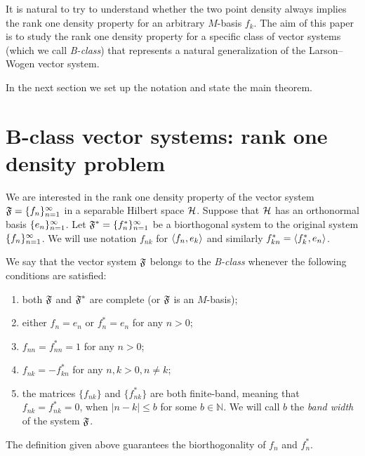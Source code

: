\documentclass[12pt,oneside,a4paper]{amsart}
\begin{document}
  It is natural to try to understand whether the two point density always implies the rank one density property for an arbitrary $M$-basis $f_k$.
  The aim of this paper is to study the rank one density property for a specific class of vector systems (which we call \emph{B-class})
    that represents a natural generalization of the Larson--Wogen vector system.

  In the next section we set up the notation and state the main theorem.

\bigskip
\section{B-class vector systems: rank one density problem}
    \label{fsys2graphs}
    We are interested in the rank one density property of the vector system $\fsys = \seq{f}$
      in a separable Hilbert space $\cal{H}$.
    Suppose that $\cal{H}$ has an orthonormal basis $\seq{e}$.
    Let $\fstarsys = \{f_n^{*}\}_{n=1}^\infty$ be a biorthogonal system to the original system $\seq{f}$.
    We will use notation $f_{nk}$ for $\inner{f_n}{e_k}$ and similarly $f^*_{kn} = \inner{f^*_k}{e_n}$.
    \begin{definition}
      We say that the vector system $\fsys$ belongs to the \emph{B-class} whenever the following conditions are satisfied:
      \begin{enumerate}[label=\textbf{C\arabic*}]
        \item \label{c1} both $\fsys$ and $\fstarsys$ are complete (or $\fsys$ is an $M$-basis);
        \item \label{c2} either $f_n = e_n$ or $f^*_n = e_n$ for any $n > 0$;
        \item \label{c3} $f_{nn} = f^*_{nn} = 1$ for any $n > 0$;
        \item \label{c4} $f_{nk} = -f^*_{kn}$ for any $n, k > 0, n \neq k$;
        \item \label{c5} the matrices $\{f_{nk}\}$ and $\{f^*_{nk}\}$ are both finite-band,
          meaning that $f_{nk} = f^*_{nk} = 0$, when $\lvert n - k \rvert \leq b$ for some $b \in \mathbb{N}$.
          We will call $b$ the \emph{band width} of the system $\fsys$.
      \end{enumerate}
    \end{definition}
    \begin{prop}
      The definition given above guarantees the biorthogonality of $f_n$ and $f^*_n$.
    \end{prop}
\end{document}
